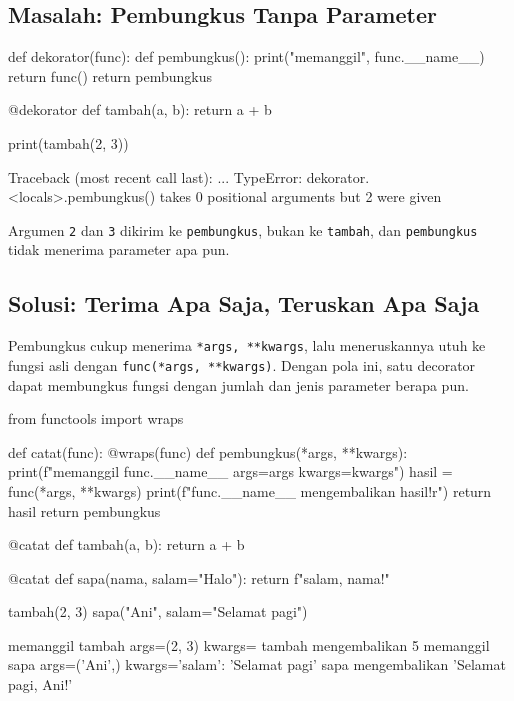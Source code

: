 \subsection{Masalah: Pembungkus Tanpa Parameter}

\begin{kode}
def dekorator(func):
    def pembungkus():
        print("memanggil", func.__name__)
        return func()
    return pembungkus

@dekorator
def tambah(a, b):
    return a + b

print(tambah(2, 3))
\end{kode}

\begin{keluaran}
Traceback (most recent call last):
  ...
TypeError: dekorator.<locals>.pembungkus() takes 0 positional arguments but 2 were given
\end{keluaran}

Argumen \texttt{2} dan \texttt{3} dikirim ke \texttt{pembungkus}, bukan ke \texttt{tambah}, dan \texttt{pembungkus} tidak menerima parameter apa pun.

\subsection{Solusi: Terima Apa Saja, Teruskan Apa Saja}

Pembungkus cukup menerima \texttt{*args, **kwargs}, lalu meneruskannya utuh ke fungsi asli dengan \texttt{func(*args, **kwargs)}. Dengan pola ini, satu decorator dapat membungkus fungsi dengan jumlah dan jenis parameter berapa pun.

\begin{kode}
from functools import wraps

def catat(func):
    @wraps(func)
    def pembungkus(*args, **kwargs):
        print(f"memanggil {func.__name__} args={args} kwargs={kwargs}")
        hasil = func(*args, **kwargs)
        print(f"{func.__name__} mengembalikan {hasil!r}")
        return hasil
    return pembungkus

@catat
def tambah(a, b):
    return a + b

@catat
def sapa(nama, salam="Halo"):
    return f"{salam}, {nama}!"

tambah(2, 3)
sapa("Ani", salam="Selamat pagi")
\end{kode}

\begin{keluaran}
memanggil tambah args=(2, 3) kwargs={}
tambah mengembalikan 5
memanggil sapa args=('Ani',) kwargs={'salam': 'Selamat pagi'}
sapa mengembalikan 'Selamat pagi, Ani!'
\end{keluaran}


